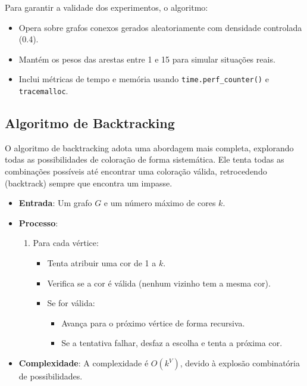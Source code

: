\documentclass[12pt]{article}
\begin{document}
Para garantir a validade dos experimentos, o algoritmo:
\begin{itemize}
    \item Opera sobre grafos conexos gerados aleatoriamente com densidade controlada (0.4).
    \item Mantém os pesos das arestas entre 1 e 15 para simular situações reais.
    \item Inclui métricas de tempo e memória usando \texttt{time.perf\_counter()} e \texttt{tracemalloc}.
\end{itemize}

\subsection{Algoritmo de Backtracking}

O algoritmo de backtracking adota uma abordagem mais completa, explorando todas as possibilidades de coloração de forma sistemática. Ele tenta todas as combinações possíveis até encontrar uma coloração válida, retrocedendo (backtrack) sempre que encontra um impasse.

\begin{itemize}
    \item \textbf{Entrada}: Um grafo \( G \) e um número máximo de cores \( k \).
    \item \textbf{Processo}:
    \begin{enumerate}
        \item Para cada vértice:
        \begin{itemize}
            \item Tenta atribuir uma cor de 1 a \( k \).
            \item Verifica se a cor é válida (nenhum vizinho tem a mesma cor).
            \item Se for válida:
            \begin{itemize}
                \item Avança para o próximo vértice de forma recursiva.
                \item Se a tentativa falhar, desfaz a escolha e tenta a próxima cor.
            \end{itemize}
        \end{itemize}
    \end{enumerate}
    \item \textbf{Complexidade}: A complexidade é \( O(k^V) \), devido à explosão combinatória de possibilidades.
\end{itemize}
\end{document}
